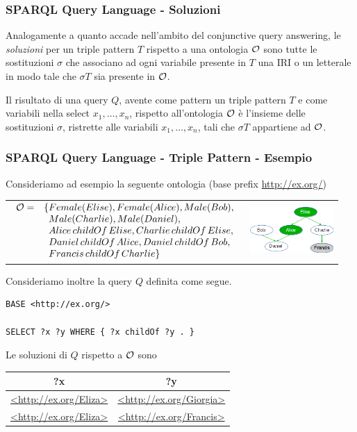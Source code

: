 \documentclass[8pt]{beamer}
\begin{document}
\begin{frame}[fragile]
\frametitle{SPARQL Query Language - Soluzioni}
Analogamente a quanto accade nell'ambito del conjunctive query answering,
le \emph{soluzioni} per un triple pattern $T$ rispetto a una ontologia $\mathcal{O}$ 
sono tutte le sostituzioni $\sigma$ che associano ad ogni variabile presente 
in $T$ una IRI o un letterale in modo tale che $\sigma T$ sia presente in $\mathcal{O}$.
\vspace{\baselineskip}

Il risultato di una query $Q$, avente come pattern un triple pattern $T$
e come variabili nella select $x_1, \ldots, x_n$,
rispetto all'ontologia $\mathcal{O}$ \`e l'insieme delle sostituzioni $\sigma$,
ristrette alle variabili $x_1, \ldots, x_n$, tali che
$\sigma T$ appartiene ad $\mathcal{O}$.
\end{frame}

\begin{frame}[fragile]
 \frametitle{SPARQL Query Language - Triple Pattern - Esempio}
 Consideriamo ad esempio la seguente ontologia (base prefix \url{http://ex.org/})
\begin{tabular}{cc}
$\begin{array}{cl}
  \Ont  =  &  \{Female(Elise), Female(Alice), Male(Bob), \\
  &\phantom{\{}Male(Charlie), Male(Daniel), \\
  &\phantom{\{}Alice\,childOf\,Elise, Charlie\,childOf\,Elise, \\
  &\phantom{\{}Daniel\,childOf\,Alice, Daniel\,childOf\,Bob, \\
  &\phantom{\{}Francis\,childOf\,Charlie \}
 \end{array}$ & \includegraphics[width=120px]{family.png} \\
\end{tabular}

Consideriamo inoltre la query $Q$ definita come segue.

\begin{Verbatim}[fontsize=\small]
BASE <http://ex.org/>

SELECT ?x ?y WHERE { ?x childOf ?y . }
\end{Verbatim}

Le soluzioni di $Q$ rispetto a $\mathcal{O}$ sono
\begin{tabular}{|c|c|}
\hline 
?x & ?y \\
\hline
\url{<http://ex.org/Eliza>} & \url{<http://ex.org/Giorgia>} \\
\url{<http://ex.org/Eliza>} & \url{<http://ex.org/Francis>} \\
\hline 
\end{tabular}
\end{frame}
\end{document}
